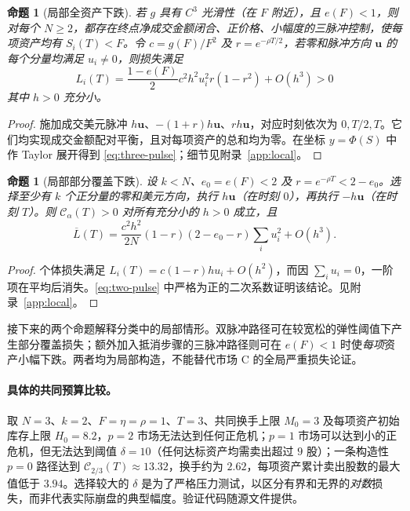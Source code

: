 \documentclass[11pt]{article}
\numberwithin{equation}{section}
\newtheorem{proposition}[theorem]{命题}
\theoremstyle{definition}
\theoremstyle{remark}
\newcommand{\Cris}{\mathcal{C}}
\begin{document}
\begin{proposition}[局部全资产下跌]\label{prop:three-pulse}
若 $g$ 具有 $C^3$ 光滑性（在 $F$ 附近），且 $e(F)<1$，则对每个 $N\ge2$，都存在终点净成交金额闭合、正价格、小幅度的三脉冲控制，使\emph{每项}资产均有 $S_i(T)<F$。令 $c=g(F)/F^2$ 及 $r=e^{-\rho T/2}$，若零和脉冲方向 $\bm u$ 的每个分量均满足 $u_i\ne0$，则损失满足
\begin{equation}\label{eq:three-pulse}
L_i(T)=\frac{1-e(F)}2c^2h^2u_i^2r(1-r^2)+O(h^3)>0
\end{equation}
其中 $h>0$ 充分小。
\end{proposition}
\begin{proof}
施加成交美元脉冲 $h\bm u$、$-(1+r)h\bm u$、$rh\bm u$，对应时刻依次为 $0,T/2,T$。它们均实现成交金额配对平衡，且对每项资产的总和均为零。在坐标 $y=\Phi(S)$ 中作 Taylor 展开得到 \eqref{eq:three-pulse}；细节见附录~\ref{app:local}。
\end{proof}

\begin{proposition}[局部部分覆盖下跌]\label{prop:two-pulse}
设 $k<N$、$e_0=e(F)<2$ 及 $r=e^{-\rho T}<2-e_0$。选择至少有 $k$ 个正分量的零和美元方向，执行 $h\bm u$（在时刻 $0$），再执行 $-h\bm u$（在时刻 $T$）。则 $\Cris_\alpha(T)>0$ 对所有充分小的 $h>0$ 成立，且
\begin{equation}\label{eq:two-pulse}
\overline L(T)=\frac{c^2h^2}{2N}(1-r)(2-e_0-r)\sum_iu_i^2+O(h^3).
\end{equation}
\end{proposition}
\begin{proof}
个体损失满足 $L_i(T)=c(1-r)hu_i+O(h^2)$，而因 $\sum_i u_i=0$，一阶项在平均后消失。\eqref{eq:two-pulse} 中严格为正的二次系数证明该结论。见附录~\ref{app:local}。
\end{proof}

接下来的两个命题解释分类中的局部情形。双脉冲路径可在较宽松的弹性阈值下产生部分覆盖损失；额外加入抵消步骤的三脉冲路径则可在 $e(F)<1$ 时使\emph{每项}资产小幅下跌。两者均为局部构造，不能替代市场 C 的全局严重损失论证。

\paragraph{具体的共同预算比较。} 取 $N=3$、$k=2$、$F=\eta=\rho=1$、$T=3$、共同换手上限 $M_0=3$ 及每项资产初始库存上限 $H_0=8.2$，$p=2$ 市场无法达到任何正危机；$p=1$ 市场可以达到小的正危机，但无法达到阈值 $\delta=10$（任何达标资产均需卖出超过 $9$ 股）；一条构造性 $p=0$ 路径达到 $\Cris_{2/3}(T)\approx13.32$，换手约为 $2.62$，每项资产累计卖出股数的最大值低于 $3.94$。选择较大的 $\delta$ 是为了严格压力测试，以区分有界和无界的\emph{对数}损失，而非代表实际崩盘的典型幅度。验证代码随源文件提供。
\end{document}
